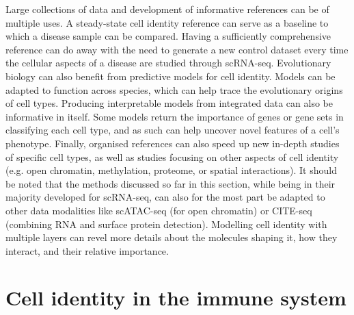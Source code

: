 Large collections of data and development of informative references can be of multiple uses. A steady-state cell identity reference can serve as a baseline to which a disease sample can be compared. Having a sufficiently comprehensive reference can do away with the need to generate a new control dataset every time the cellular aspects of a disease are studied through scRNA-seq. Evolutionary biology can also benefit from predictive models for cell identity. Models can be adapted to function across species, which can help trace the evolutionary origins of cell types. Producing interpretable models from integrated data can also be informative in itself. Some models return the importance of genes or gene sets in classifying each cell type, and as such can help uncover novel features of a cell's phenotype. Finally, organised references can also speed up new in-depth studies of specific cell types, as well as studies focusing on other aspects of cell identity (e.g. open chromatin, methylation, proteome, or spatial interactions). It should be noted that the methods discussed so far in this section, while being in their majority developed for scRNA-seq, can also for the most part be adapted to other data modalities like scATAC-seq (for open chromatin) or CITE-seq (combining RNA and surface protein detection). Modelling cell identity with multiple layers can revel more details about the molecules shaping it, how they interact, and their relative importance.



\section{Cell identity in the immune system}  %
\label{section1.4}

